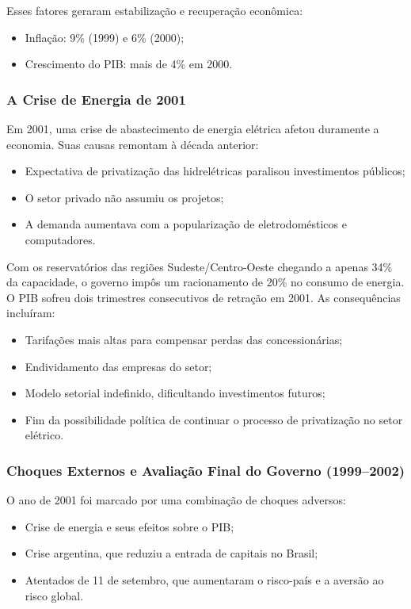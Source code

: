 \documentclass[a4paper,12pt]{article}[abntex2]
\begin{document}
Esses fatores geraram estabilização e recuperação econômica:
\begin{itemize}
    \item Inflação: 9\% (1999) e 6\% (2000);
    \item Crescimento do PIB: mais de 4\% em 2000.
\end{itemize}

\subsubsection{\textbf{A Crise de Energia de 2001}}

Em 2001, uma crise de abastecimento de energia elétrica afetou duramente a economia. Suas causas remontam à década anterior:

\begin{itemize}
    \item Expectativa de privatização das hidrelétricas paralisou investimentos públicos;
    \item O setor privado não assumiu os projetos;
    \item A demanda aumentava com a popularização de eletrodomésticos e computadores.
\end{itemize}

Com os reservatórios das regiões Sudeste/Centro-Oeste chegando a apenas 34\% da capacidade, o governo impôs um racionamento de 20\% no consumo de energia. O PIB sofreu dois trimestres consecutivos de retração em 2001. As consequências incluíram:

\begin{itemize}
    \item Tarifações mais altas para compensar perdas das concessionárias;
    \item Endividamento das empresas do setor;
    \item Modelo setorial indefinido, dificultando investimentos futuros;
    \item Fim da possibilidade política de continuar o processo de privatização no setor elétrico.
\end{itemize}

\subsubsection{\textbf{Choques Externos e Avaliação Final do Governo (1999–2002)}}

O ano de 2001 foi marcado por uma combinação de choques adversos:

\begin{itemize}
    \item Crise de energia e seus efeitos sobre o PIB;
    \item Crise argentina, que reduziu a entrada de capitais no Brasil;
    \item Atentados de 11 de setembro, que aumentaram o risco-país e a aversão ao risco global.
\end{itemize}
\end{document}
